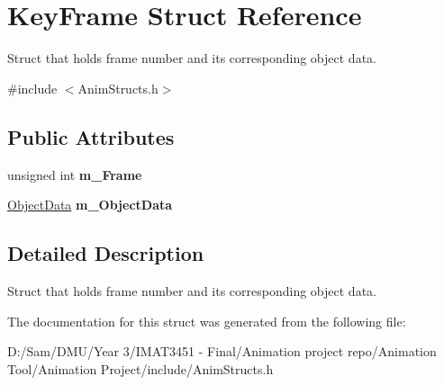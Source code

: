 \hypertarget{struct_key_frame}{}\section{Key\+Frame Struct Reference}
\label{struct_key_frame}


Struct that holds frame number and its corresponding object data.  




{\ttfamily \#include $<$Anim\+Structs.\+h$>$}

\subsection*{Public Attributes}
\begin{DoxyCompactItemize}
\item 
\mbox{\label{struct_key_frame_accd5dd8cf11311d70e84138329fb0e9e}} 
unsigned int {\bfseries m\+\_\+\+Frame}
\item 
\mbox{\label{struct_key_frame_a221a8068b554fdfba1df906d1204f019}} 
\hyperlink{class_object_data}{Object\+Data} {\bfseries m\+\_\+\+Object\+Data}
\end{DoxyCompactItemize}


\subsection{Detailed Description}
Struct that holds frame number and its corresponding object data. 

The documentation for this struct was generated from the following file\+:\begin{DoxyCompactItemize}
\item 
D\+:/\+Sam/\+D\+M\+U/\+Year 3/\+I\+M\+A\+T3451 -\/ Final/\+Animation project repo/\+Animation Tool/\+Animation Project/include/Anim\+Structs.\+h\end{DoxyCompactItemize}
